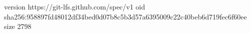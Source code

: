 version https://git-lfs.github.com/spec/v1
oid sha256:958897fd48012df34bed0d07b8c5b3d57a6395009c22c40beb6d719fec6f60ee
size 2798
